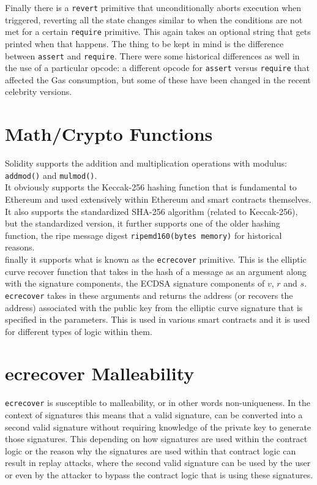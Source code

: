 Finally there is a \texttt{revert} primitive that unconditionally aborts execution when triggered, reverting all the state changes similar to when the conditions are not met for a certain \texttt{require} primitive. This again takes an optional string that gets printed when that happens. The thing to be kept in mind is the difference between \texttt{assert} and \texttt{require}. There were some historical differences as well in the use of a particular opcode: a different opcode for \texttt{assert} versus \texttt{require} that affected the Gas consumption, but some of these have been changed in the recent celebrity versions.

\section{Math/Crypto Functions}
Solidity supports the addition and multiplication operations with modulus: \texttt{addmod()} and \texttt{mulmod()}.\\ 

It obviously supports the Keccak-256 hashing function that is fundamental to Ethereum and used extensively within Ethereum and smart contracts themselves.\\

It also supports the standardized SHA-256 algorithm (related to Keccak-256), but the standardized version, it further supports one of the older hashing function,  the ripe message digest \texttt{ripemd160(bytes memory)} for historical reasons.\\

finally it supports what is known as the \texttt{ecrecover} primitive. This is the elliptic curve recover function that takes in the hash of a message as an argument along with the signature components, the ECDSA signature components of $v$, $r$ and $s$. \texttt{ecrecover} takes in these arguments and returns the address (or recovers the address) associated with the public key from the elliptic curve signature that is specified in the parameters. This is used in various smart contracts and it is used for different types of logic within them.

\section{ecrecover Malleability}
\texttt{ecrecover} is susceptible to malleability, or in other words non-uniqueness. In the context of signatures this means that a valid signature, can be converted into a second valid signature without requiring knowledge of the private key to generate those signatures. This depending on how signatures are used within the contract logic or the reason why the signatures are used within that contract logic can result in replay attacks, where the second valid signature can be used by the user or even by the attacker to bypass the contract logic that is using these signatures.\\

